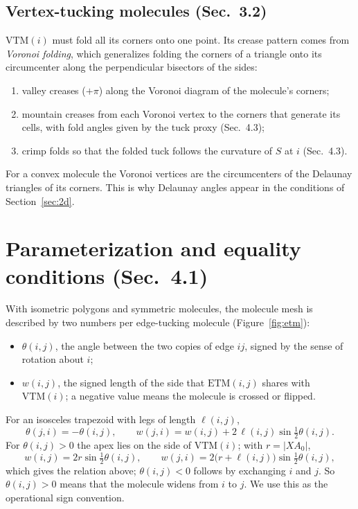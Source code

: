 \documentclass[11pt]{article}
\theoremstyle{definition}
\newcommand{\ETM}{\mathrm{ETM}}
\newcommand{\VTM}{\mathrm{VTM}}
\begin{document}
\subsection{Vertex-tucking molecules (Sec.~3.2)}

$\VTM(i)$ must fold all its corners onto one point. Its crease pattern comes
from \emph{Voronoi folding}, which generalizes folding the corners of a triangle
onto its circumcenter along the perpendicular bisectors of the sides:
\begin{enumerate}[nosep]
  \item valley creases ($+\pi$) along the Voronoi diagram of the molecule's
    corners;
  \item mountain creases from each Voronoi vertex to the corners that generate
    its cells, with fold angles given by the tuck proxy (Sec.~4.3);
  \item crimp folds so that the folded tuck follows the curvature of $S$ at $i$
    (Sec.~4.3).
\end{enumerate}
For a convex molecule the Voronoi vertices are the circumcenters of the Delaunay
triangles of its corners. This is why Delaunay angles appear in the conditions
of Section~\ref{sec:2d}.

\section{Parameterization and equality conditions (Sec.~4.1)}

With isometric polygons and symmetric molecules, the molecule mesh is described
by two numbers per edge-tucking molecule (Figure~\ref{fig:etm}):
\begin{itemize}[nosep]
  \item $\theta(i,j)$, the angle between the two copies of edge $ij$, signed by
    the sense of rotation about $i$;
  \item $w(i,j)$, the signed length of the side that $\ETM(i,j)$ shares with
    $\VTM(i)$; a negative value means the molecule is crossed or flipped.
\end{itemize}
For an isosceles trapezoid with legs of length $\ell(i,j)$,
\begin{equation*}
  \theta(j,i) = -\theta(i,j), \qquad
  w(j,i) = w(i,j) + 2\,\ell(i,j) \sin\tfrac12\theta(i,j).
  \tag*{(Sec.~4.1)}
\end{equation*}
For $\theta(i,j) > 0$ the apex lies on the side of $\VTM(i)$; with $r = |XA_0|$,
\begin{equation}
  w(i,j) = 2r \sin\tfrac12\theta(i,j), \qquad
  w(j,i) = 2\bigl(r + \ell(i,j)\bigr) \sin\tfrac12\theta(i,j),
  \label{eq:apex}
\end{equation}
which gives the relation above; $\theta(i,j) < 0$ follows by exchanging $i$ and
$j$. So $\theta(i,j) > 0$ means that the molecule widens from $i$ to $j$. We use
this as the operational sign convention.
\end{document}
